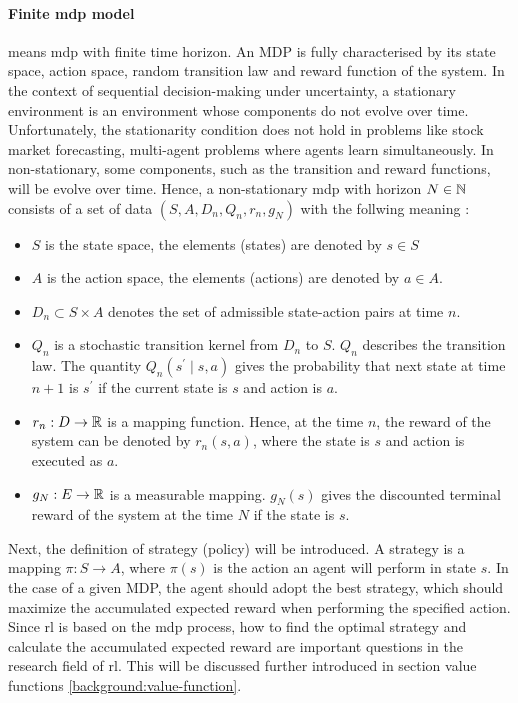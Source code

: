 \paragraph{Finite \gls{mdp} model}
means \gls{mdp} with finite time horizon. An MDP is fully characterised by its state space, action space, random transition law and reward function of the system. In the context of sequential decision-making under uncertainty, a stationary environment is an environment whose components do not evolve over time. Unfortunately, the stationarity condition does not hold in problems like stock market forecasting, multi-agent problems where agents learn simultaneously\parencite{hadoux:tel-01259918}. In non-stationary, some components, such as the transition and reward functions, will be  evolve over time. Hence, a non-stationary \gls{mdp} with horizon $N \in \mathbb{N}$ consists of a set of data $(S, A, D_n, Q_n, r_n, g_N)$ with the follwing meaning \parencite{Bäuerle2010}:

\begin{itemize}
\item $S$ is the state space, the elements (states) are denoted by $s \in S$
\item $A$ is the action space, the elements (actions) are denoted by $a \in A$.
\item $D_{n} \subset S \times A$ denotes the set of admissible state-action pairs at time $n$.
\item $Q_n$ is a stochastic transition kernel from $D_n$ to $S$. $Q_n$ describes the transition law. The quantity $Q_n(s^{\prime} \mid s, a)$ gives the probability that next state at time $n+1$ is $s^{\prime}$ if the current state is $s$ and action is $a$.
\item $r_n: D \rightarrow \mathbb{R}$ is a mapping function. Hence, at the time $n$, the reward of the system can be denoted by $r_n(s, a)$, where the state is $s$ and action is executed as $a$.
\item $g_N: E \rightarrow \mathbb{R}$ is a measurable mapping. $g_N(s)$ gives the discounted terminal reward of the system at the time $N$ if the state is $s$. 
\end{itemize}

Next, the definition of strategy (policy) will be introduced. A strategy is a mapping $\pi: S \rightarrow A$, where $\pi(s)$ is the action an agent will perform in state $s$. In the case of a given MDP, the agent should adopt the best strategy, which should maximize the accumulated expected reward when performing the specified action. Since \gls{rl} is based on the \gls{mdp} process, how to find the optimal strategy and calculate the accumulated expected reward are important questions in the research field of \gls{rl}. This will be discussed further introduced in section value functions \ref{background:value-function}.

